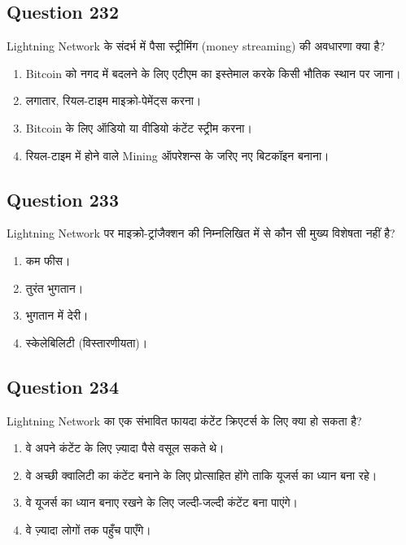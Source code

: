 \documentclass[12pt,a4paper]{article}
\begin{document}
\bigskip


\subsection*{Question 232}
Lightning Network के संदर्भ में पैसा स्ट्रीमिंग (money streaming) की अवधारणा क्या है?

\begin{enumerate}[label=\Alph*., leftmargin=*]
\item Bitcoin को नगद में बदलने के लिए एटीएम का इस्तेमाल करके किसी भौतिक स्थान पर जाना।
\item लगातार, रियल-टाइम माइक्रो-पेमेंट्स करना।
\item Bitcoin के लिए ऑडियो या वीडियो कंटेंट स्ट्रीम करना।
\item रियल-टाइम में होने वाले Mining ऑपरेशन्स के जरिए नए बिटकॉइन बनाना।
\end{enumerate}

\bigskip


\subsection*{Question 233}
Lightning Network पर माइक्रो-ट्रांजैक्शन की निम्नलिखित में से कौन सी मुख्य विशेषता नहीं है?

\begin{enumerate}[label=\Alph*., leftmargin=*]
\item कम फीस।
\item तुरंत भुगतान।
\item भुगतान में देरी।
\item स्केलेबिलिटी (विस्तारणीयता)।
\end{enumerate}

\bigskip


\subsection*{Question 234}
Lightning Network का एक संभावित फायदा कंटेंट क्रिएटर्स के लिए क्या हो सकता है?

\begin{enumerate}[label=\Alph*., leftmargin=*]
\item वे अपने कंटेंट के लिए ज़्यादा पैसे वसूल सकते थे।
\item वे अच्छी क्वालिटी का कंटेंट बनाने के लिए प्रोत्साहित होंगे ताकि यूजर्स का ध्यान बना रहे।
\item वे यूजर्स का ध्यान बनाए रखने के लिए जल्दी-जल्दी कंटेंट बना पाएंगे।
\item वे ज़्यादा लोगों तक पहुँच पाएँगे।
\end{enumerate}
\end{document}
